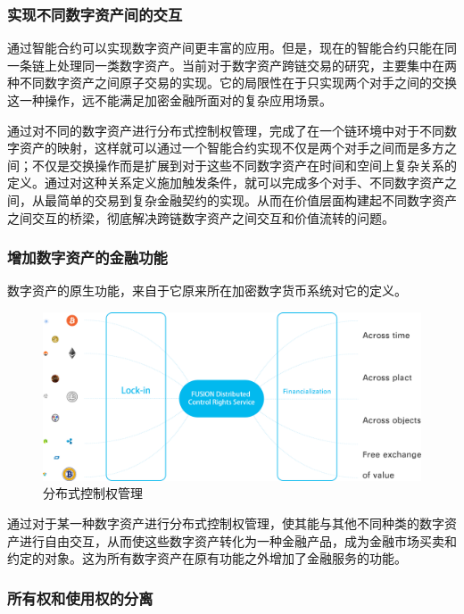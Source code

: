 \documentclass[a4paper,12pt]{article}
\begin{document}
\subsubsection{实现不同数字资产间的交互}

通过智能合约可以实现数字资产间更丰富的应用。但是，现在的智能合约只能在同一条链上处理同一类数字资产。当前对于数字资产跨链交易的研究，主要集中在两种不同数字资产之间原子交易的实现。它的局限性在于只实现两个对手之间的交换这一种操作，远不能满足加密金融所面对的复杂应用场景。

通过对不同的数字资产进行分布式控制权管理，完成了在一个链环境中对于不同数字资产的映射，这样就可以通过一个智能合约实现不仅是两个对手之间而是多方之间；不仅是交换操作而是扩展到对于这些不同数字资产在时间和空间上复杂关系的定义。通过对这种关系定义施加触发条件，就可以完成多个对手、不同数字资产之间，从最简单的交易到复杂金融契约的实现。从而在价值层面构建起不同数字资产之间交互的桥梁，彻底解决跨链数字资产之间交互和价值流转的问题。

\subsubsection{增加数字资产的金融功能}

数字资产的原生功能，来自于它原来所在加密数字货币系统对它的定义。

\begin{figure}[htbp]
	\centering\includegraphics[width=5in]{pic/custoday.png}
	\caption{分布式控制权管理}\label{fig:1}
\end{figure}

通过对于某一种数字资产进行分布式控制权管理，使其能与其他不同种类的数字资产进行自由交互，从而使这些数字资产转化为一种金融产品，成为金融市场买卖和约定的对象。这为所有数字资产在原有功能之外增加了金融服务的功能。

\subsubsection{所有权和使用权的分离}
\end{document}
